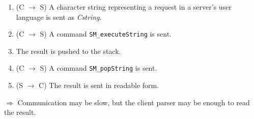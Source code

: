 \begin{slide}{}

\begin{enumerate}
\item (C $\rightarrow$ S) A character string representing a request in a server's
user language is sent as {\sl Cstring}.
\item (C $\rightarrow$ S) A command {\tt SM\_executeString} is sent.
\item The result is pushed to the stack.
\item (C $\rightarrow$ S) A command {\tt SM\_popString} is sent.
\item (S $\rightarrow$ C) The result is sent in readable form.
\end{enumerate}

$\Rightarrow$ Communication may be slow, but the client parser may be
enough to read the result.
\end{slide}

